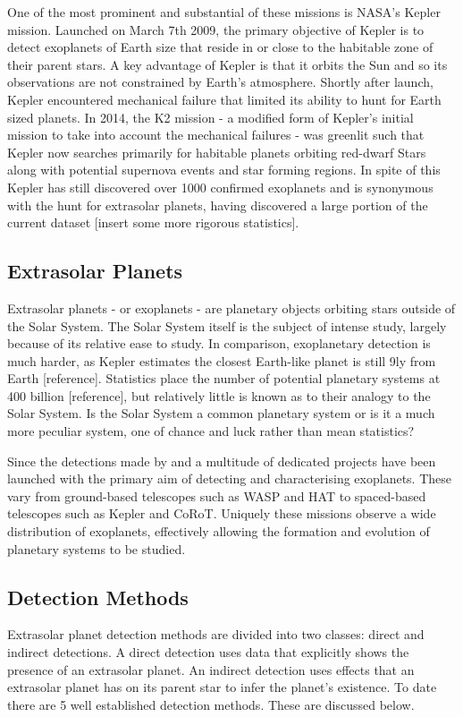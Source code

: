 \documentclass{report}
\begin{document}
One of the most prominent and substantial of these missions is NASA's Kepler mission. Launched on March 7th 2009, the primary objective of Kepler is to detect exoplanets of Earth size that reside in or close to the habitable zone of their parent stars. A key advantage of Kepler is that it orbits the Sun and so its observations are not constrained by Earth's atmosphere.  Shortly after launch, Kepler encountered mechanical failure that limited its ability to hunt for Earth sized planets. In 2014, the K2 mission - a modified form of Kepler's initial mission to take into account the mechanical failures - was greenlit such that Kepler now searches primarily for habitable planets orbiting red-dwarf Stars along with potential supernova events and star forming regions. In spite of this Kepler has still discovered over 1000 confirmed exoplanets and is synonymous with the hunt for extrasolar planets, having discovered a large portion of the current dataset [insert some more rigorous statistics].

\subsection{Extrasolar Planets}
Extrasolar planets - or exoplanets - are planetary objects orbiting stars outside of the Solar System. The Solar System itself is the subject of intense study, largely because of its relative ease to study. In comparison, exoplanetary detection is much harder, as Kepler estimates the closest Earth-like planet is still 9ly from Earth [reference].  Statistics place the number of potential planetary systems at 400 billion [reference], but relatively little is known as to their analogy to the Solar System. Is the Solar System a common planetary system or is it a much more peculiar system, one of chance and luck rather than mean statistics?  

Since the detections made by \citeauthor{first} and \citeauthor{MQ} a multitude of dedicated projects have been launched with the primary aim of detecting and characterising exoplanets. These vary from ground-based telescopes such as WASP and HAT to spaced-based telescopes such as Kepler and CoRoT. Uniquely these missions observe a wide distribution of exoplanets, effectively allowing the formation and evolution of planetary systems to be studied. 

\subsection{Detection Methods}
Extrasolar planet detection methods are divided into two classes: direct and indirect detections. A direct detection uses data that explicitly shows the presence of an extrasolar planet. An indirect detection uses effects that an extrasolar planet has on its parent star to infer the planet's existence. To date there are 5 well established detection methods. These are discussed below.  
\end{document}

